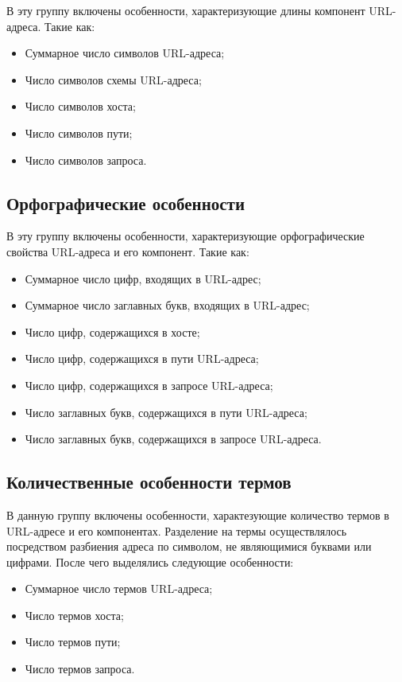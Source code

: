 В эту группу включены особенности, характеризующие длины компонент URL-адреса. Такие как:

\begin{itemize}
\item Суммарное число символов URL-адреса;
\item Число символов схемы URL-адреса;
\item Число символов хоста;
\item Число символов пути;
\item Число символов запроса.
\end{itemize}

\subsection*{Орфографические особенности}

В эту группу включены особенности, характеризующие орфографические свойства URL-адреса и его компонент. Такие как:

\begin{itemize}
\item Суммарное число цифр, входящих в URL-адрес;
\item Суммарное число заглавных букв, входящих в URL-адрес;
\item Число цифр, содержащихся в хосте;
\item Число цифр, содержащихся в пути URL-адреса;
\item Число цифр, содержащихся в запросе URL-адреса;
\item Число заглавных букв, содержащихся в пути URL-адреса;
\item Число заглавных букв, содержащихся в запросе URL-адреса.
\end{itemize}

\subsection*{Количественные особенности термов}

В данную группу включены особенности, характезующие количество термов в URL-адресе и его компонентах. Разделение на термы осуществлялось посредством разбиения адреса по символом, не являющимися буквами или цифрами. После чего выделялись следующие особенности:

\begin{itemize}
\item Суммарное число термов URL-адреса;
\item Число термов хоста;
\item Число термов пути;
\item Число термов запроса.
\end{itemize}

